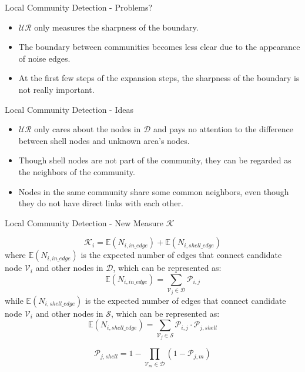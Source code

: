 \documentclass[9pt]{beamer}
\begin{document}
\begin{frame}{Local Community Detection - Problems?}

\begin{itemize}
\item $\mathcal{UR}$ only measures the sharpness of the boundary.
\item The boundary between communities becomes less clear due to the appearance of noise edges.
\item At the first few steps of the expansion steps, the sharpness of the boundary is not really important.
\end{itemize}
\end{frame}

\begin{frame}{Local Community Detection - Ideas}

\begin{itemize}
\item $\mathcal{UR}$ only cares about the nodes in $\mathcal{D}$ and pays no attention to the difference between shell nodes and unknown area’s nodes.
\item Though shell nodes are not part of the community, they can be regarded as the neighbors of the community.
\item Nodes in the same community share some common neighbors, even though they do not have direct links with each other.
\end{itemize}
\end{frame}



\begin{frame}{Local Community Detection - New Measure $\mathcal{K}$}

\begin{equation}
\mathcal{K}_i = \mathbb{E}(N_{i,in\_edge}) + \mathbb{E}(N_{i,shell\_edge})
\end{equation}
where $\mathbb{E}(N_{i,in\_edge})$ is the expected number of edges that connect candidate node $\mathcal{V}_i$ and other nodes in $\mathcal{D}$, which can be represented as:
\begin{equation}
\mathbb{E}(N_{i,in\_edge}) = \sum_{\mathcal{V}_j\in \mathcal{D}}\mathcal{P}_{i,j}
\end{equation}
while $\mathbb{E}(N_{i,shell\_edge})$ is the expected number of edges that connect candidate node $\mathcal{V}_i$ and other nodes in $\mathcal{S}$, which can be represented as:
\begin{equation}
\mathbb{E}(N_{i,shell\_edge}) = \sum_{\mathcal{V}_j\in \mathcal{S}}\mathcal{P}_{i,j}\cdot \mathcal{P}_{j,shell}
\end{equation}

\begin{equation}
\mathcal{P}_{j,shell} = 1-\prod_{\mathcal{V}_m\in \mathcal{D}}(1-\mathcal{P}_{j,m})
\end{equation}

\end{frame}
\end{document}
